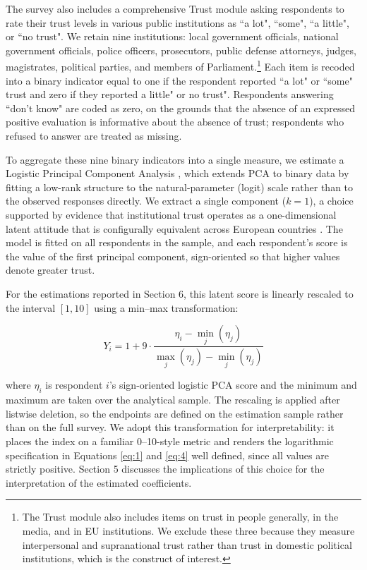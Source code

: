 \documentclass{article}
\begin{document}
The survey also includes a comprehensive Trust module asking respondents to rate their trust levels in various public institutions as ``a lot", ``some", ``a little", or ``no trust". We retain nine institutions: local government officials, national government officials, police officers, prosecutors, public defense attorneys, judges, magistrates, political parties, and members of Parliament.\footnote{The Trust module also includes items on trust in people generally, in the media, and in EU institutions. We exclude these three because they measure interpersonal and supranational trust rather than trust in domestic political institutions, which is the construct of interest.} Each item is recoded into a binary indicator equal to one if the respondent reported ``a lot" or ``some" trust and zero if they reported a little" or no trust". Respondents answering ``don't know" are coded as zero, on the grounds that the absence of an expressed positive evaluation is informative about the absence of trust; respondents who refused to answer are treated as missing.

To aggregate these nine binary indicators into a single measure, we estimate a Logistic Principal Component Analysis \parencite{landgraf_dimensionality_2020}, which extends PCA to binary data by fitting a low-rank structure to the natural-parameter (logit) scale rather than to the observed responses directly. We extract a single component ($k=1$), a choice supported by evidence that institutional trust operates as a one-dimensional latent attitude that is configurally equivalent across European countries \parencite{marien_measuring_2011}. The model is fitted on all respondents in the sample, and each respondent's score is the value of the first principal component, sign-oriented so that higher values denote greater trust.

For the estimations reported in Section 6, this latent score is linearly rescaled to the interval $[1,10]$ using a min--max transformation:

\begin{equation}
\label{eq:rescale}
Y_i = 1 + 9 \cdot \frac{\eta_i - \min_j(\eta_j)}{\max_j(\eta_j) - \min_j(\eta_j)}
\end{equation}

where $\eta_i$ is respondent $i$'s sign-oriented logistic PCA score and the minimum and maximum are taken over the analytical sample. The rescaling is applied after listwise deletion, so the endpoints are defined on the estimation sample rather than on the full survey. We adopt this transformation for interpretability: it places the index on a familiar 0--10-style metric and renders the logarithmic specification in Equations \ref{eq:1} and \ref{eq:4} well defined, since all values are strictly positive. Section 5 discusses the implications of this choice for the interpretation of the estimated coefficients.
\end{document}
